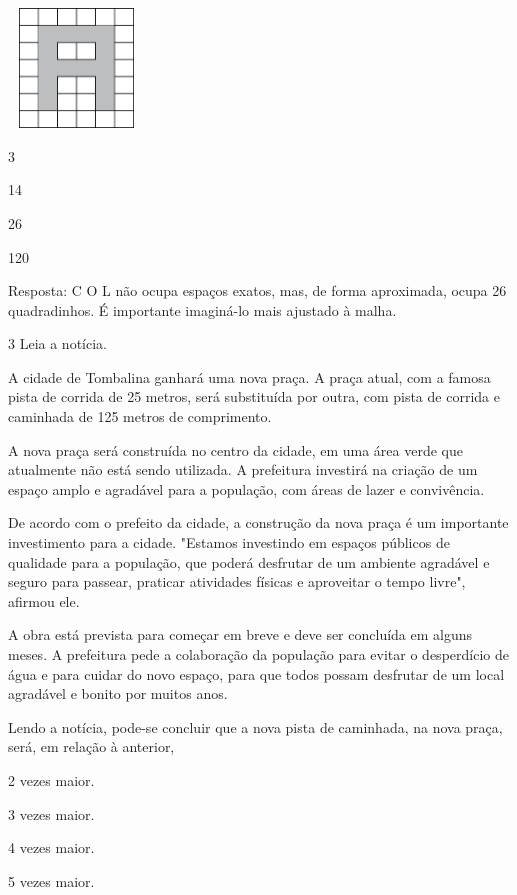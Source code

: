 \begin{escolha}
\includegraphics[width=1.42949in,height=1.25160in]{media/image62.png}

\begin{escolha}
\item
  3
\item
  14
\item
  26
\item
  120
\end{escolha}

Resposta: C
O L não ocupa espaços exatos, mas, de forma aproximada, ocupa 26 quadradinhos. É importante imaginá-lo mais ajustado à malha.

\num{3} Leia a notícia.


A cidade de Tombalina ganhará uma nova praça. A praça atual, com a famosa pista de corrida de 25 metros, será substituída por outra, com pista de corrida e caminhada de 125 metros de comprimento.

A nova praça será construída no centro da cidade, em uma área verde que atualmente não está sendo utilizada. A prefeitura investirá na criação de um espaço amplo e agradável para a população, com áreas de lazer e convivência.

De acordo com o prefeito da cidade, a construção da nova praça é um importante investimento para a cidade. "Estamos investindo em espaços públicos de qualidade para a população, que poderá desfrutar de um ambiente agradável e seguro para passear, praticar atividades físicas e aproveitar o tempo livre", afirmou ele.

A obra está prevista para começar em breve e deve ser concluída em alguns meses. A prefeitura pede a colaboração da população para evitar o desperdício de água e para cuidar do novo espaço, para que todos possam desfrutar de um local agradável e bonito por muitos anos.


Lendo a notícia, pode-se concluir que a nova pista de caminhada, na nova praça, será, em relação à anterior,

\begin{escolha}
\item
  2 vezes maior.
\item
  3 vezes maior.
\item
  4 vezes maior.
\item
  5 vezes maior.
\end{escolha}


\end{escolha}
